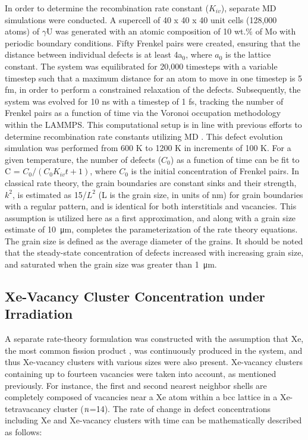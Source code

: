 \documentclass[preprint,12pt]{elsarticle}
\begin{document}
\indent In order to determine the recombination rate constant ($K_{iv}$), separate MD simulations were conducted. A supercell of 40 x 40 x 40 unit cells (128,000 atoms) of $\gamma$U was generated with an atomic composition of 10 wt.$\%$ of Mo with periodic boundary conditions. Fifty Frenkel pairs were created, ensuring that the distance between individual defects is at least 4a$_{0}$, where $a_{0}$ is the lattice constant. The system was equilibrated for 20,000 timesteps with a variable timestep such that a maximum distance for an atom to move in one timestep is 5 fm, in order to perform a constrained relaxation of the defects. Subsequently, the system was evolved for 10 ns with a timestep of 1 fs, tracking the number of Frenkel pairs as a function of time via the Voronoi occupation methodology within the LAMMPS. This computational setup is in line with previous efforts to determine recombination rate constants utilizing MD \cite{zhang2012atomistic}. This defect evolution simulation was performed from 600 K to 1200 K in increments of 100 K. For a given temperature, the number of defects ($C_{0}$) as a function of time can be fit to C = $C_{0}/(C_{0}K_{iv}t +1)$, where $C_{0}$ is the initial concentration of Frenkel pairs. In classical rate theory, the grain boundaries are constant sinks and their strength, $k^{2}$, is estimated as 15/$L^{2}$ (L is the grain size, in units of nm) for grain boundaries with a regular pattern, and is identical for both interstitials and vacancies. This assumption is utilized here as a first approximation, and along with a grain size estimate of \SI{10}{\micro\metre}, completes the parameterization of the rate theory equations. The grain size is defined as the average diameter of the grains. It should be noted that the steady-state concentration of defects increased with increasing grain size, and saturated when the grain size was greater than \SI{1}{\micro\metre}. \\

\subsection{Xe-Vacancy Cluster Concentration under Irradiation}

\indent A separate rate-theory formulation was constructed with the assumption that Xe, the most common fission product \cite{kleykamp1985chemical}, was continuously produced in the system, and thus Xe-vacancy clusters with various sizes were also present. Xe-vacancy clusters containing up to fourteen vacancies were taken into account, as mentioned previously. For instance, the first and second nearest neighbor shells are completely composed of vacancies near a Xe atom within a bcc lattice in a Xe-tetravacancy cluster ($\it{n}$=14). The rate of change in defect concentrations including Xe and Xe-vacancy clusters with time can be mathematically described as follows:
\end{document}
